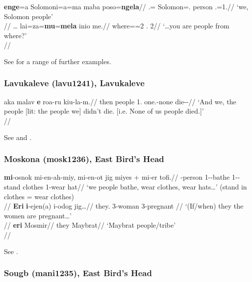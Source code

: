 \pex
\a
\begingl 
\gla \textbf{enge}=a Solomoni=a=ma maba poso=\textbf{ngela}//
\Pl{}.\Excl{}=\Lig{} Solomon=\Sg{}.\F{} person \Pl{}.\M{}=1\Pl{}.\Excl{}//
\glft `we, Solomon people' \\{\citep[85, (7.35)]{obata2003}}//
\endgl
\a 
\begingl
\gla \ldots{} lai=za=\textbf{mu}=\textbf{mela} inio me.//
\glb {} where=\Pl{}=2\Pl{}{} \Foc{}.\Nf{} 2\Pl{}//
\glft `\ldots you are people from where?' \\\citep[88, (7.49)]{obata2003}//
\endgl
\xe

See \citet[47--49, 76, 79, 84f., 87--89, 92f.]{obata2003} for a range of further examples.

\subsubsection{Lavukaleve (lavu1241), Lavukaleve}

\ex 
\begingl
\gla aka {malav} \textbf{e} roa-ru kiu-la-m.//
\glb then people 1\Pl{}.\Excl{} one.\Sg{}\M{}-none die-\Neg{}-\Sg{}\M{}//
\glft `And we, the people [lit: the people we] didn't die. [i.e. None of us people died.]'\\{\citep[after][171, (197)]{terrill2003}}//
\endgl
\xe

See \citet[171--173]{terrill2003} and \citet[435, (27)]{terrill2004}.

\subsubsection{Moskona (mosk1236), East Bird's Head}

\pex
\a
\begingl
\gla \textbf{mi}-osnok mi-en-ah-miy,  mi-en-ot jig miyes + mi-er tofi.//
\Pl{}-person 1\Pl-\Dur{}-bathe 1\Pl-\Dur{}-stand \Loc{} clothes 1\Pl{}-wear hat//
\glft `we people bathe, wear clothes, wear hats\ldots' (stand in clothes = wear clothes)\\
\citep[344, (2)]{gravelle2010}//
\endgl
\a
\begingl
\gla \textbf{Eri} \textbf{i}-ejen(a) i-odog jig\ldots//
\glb they.\Pl{} 3\Pl-woman 3\Pl-pregnant \Loc{}//
\glft `(If/when) they the women are pregnant\ldots' \\
\citep[91, (38)]{gravelle2010}//
\endgl
\a 
\begingl
\gla \textbf{eri} Mosmir//
\glb they Maybrat//
\glft `Maybrat people/tribe'\\
\citep[224, (43b)]{gravelle2010}//
\endgl
\xe

See \citet[91, 222--224, 344]{gravelle2010}.
 
\subsubsection{Sougb (mani1235), East Bird's Head}

